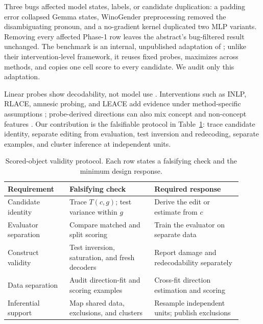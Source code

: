 \documentclass{article}
\begin{document}
Three bugs affected model states, labels, or candidate duplication: a padding error collapsed Gemma states, WinoGender preprocessing removed the disambiguating pronoun, and a no-gradient kernel duplicated two MLP variants. Removing every affected Phase-1 row leaves the abstract's bug-filtered result unchanged. The benchmark is an internal, unpublished adaptation of \citet{canby2025reliable}; unlike their intervention-level framework, it reuses fixed probes, maximizes across methods, and copies one cell score to every candidate. We audit only this adaptation.

Linear probes show decodability, not model use \citep{alain2017understanding,hewitt2019designing,belinkov2022probing}. Interventions such as INLP, RLACE, amnesic probing, and LEACE add evidence under method-specific assumptions \citep{ravfogel2020null,ravfogel2022linear,elazar2021amnesic,belrose2023leace}; probe-derived directions can also mix concept and non-concept features \citep{kumar2022unreliable}. Our contribution is the falsifiable protocol in Table~\ref{tab:protocol}: trace candidate identity, separate editing from evaluation, test inversion and redecoding, separate examples, and cluster inference at independent units.

\begin{table}[t]
\centering
\small
\setlength{\tabcolsep}{4pt}
\begin{tabular}{p{0.24\linewidth}p{0.33\linewidth}p{0.34\linewidth}}
\toprule
Requirement & Falsifying check & Required response \\
\midrule
Candidate identity & Trace $T(c,g)$; test variance within $g$ & Derive the edit or estimate from $c$ \\
Evaluator separation & Compare matched and split scoring & Train the evaluator on separate data \\
Construct validity & Test inversion, saturation, and fresh decoders & Report damage and redecodability separately \\
Data separation & Audit direction-fit and scoring examples & Cross-fit direction estimation and scoring \\
Inferential support & Map shared data, exclusions, and clusters & Resample independent units; publish exclusions \\
\bottomrule
\end{tabular}
\caption{Scored-object validity protocol. Each row states a falsifying check and the minimum design response.}
\label{tab:protocol}
\end{table}
\end{document}
